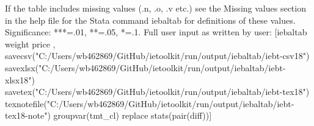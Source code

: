 If the table includes missing values (.n, .o, .v etc.) see the Missing values section in the help file for the Stata command iebaltab for definitions of these values. Significance: ***=.01, **=.05, *=.1. Full user input as written by user: [iebaltab weight price , savecsv("C:/Users/wb462869/GitHub/ietoolkit/run/output/iebaltab/iebt-csv18") savexlsx("C:/Users/wb462869/GitHub/ietoolkit/run/output/iebaltab/iebt-xlsx18") savetex("C:/Users/wb462869/GitHub/ietoolkit/run/output/iebaltab/iebt-tex18") texnotefile("C:/Users/wb462869/GitHub/ietoolkit/run/output/iebaltab/iebt-tex18-note") groupvar(tmt\_cl) replace stats(pair(diff))]
